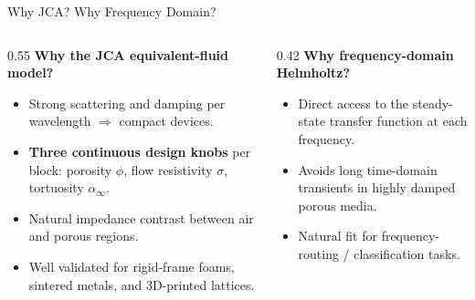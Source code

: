 \documentclass[aspectratio=169,11pt]{beamer}
\begin{document}
\begin{frame}{Why JCA? Why Frequency Domain?}
  \begin{columns}[T]
    \begin{column}{0.55\textwidth}
      \textbf{Why the JCA equivalent-fluid model?}
      \begin{itemize}
        \item Strong scattering and damping per wavelength $\Rightarrow$ compact devices.
        \item \textbf{Three continuous design knobs} per block: porosity $\phi$, flow resistivity $\sigma$, tortuosity $\alpha_\infty$.
        \item Natural impedance contrast between air and porous regions.
        \item Well validated for rigid-frame foams, sintered metals, and 3D-printed lattices.
      \end{itemize}
    \end{column}
    \begin{column}{0.42\textwidth}
      \textbf{Why frequency-domain Helmholtz?}
      \begin{itemize}
        \item Direct access to the steady-state transfer function at each frequency.
        \item Avoids long time-domain transients in highly damped porous media.
        \item Natural fit for frequency-routing / classification tasks.
      \end{itemize}
    \end{column}
  \end{columns}

  \vspace{0.3cm}
\end{frame}
\end{document}
